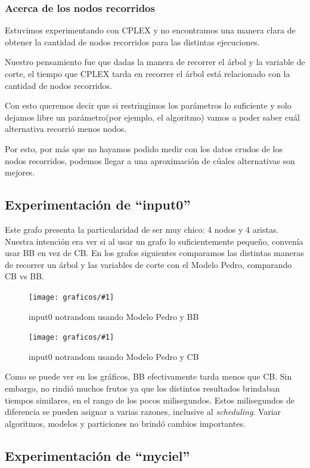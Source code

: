 \documentclass[a4paper, 10pt, twoside]{article}
\newcommand{\diagramavfig}[2]{%
  \begin{figure}[H]
    \texttt{[image: graficos/\#1]}%
    \caption{#2}
    \label{fig:#1}
  \end{figure}
}
\begin{document}
\subsubsection{Acerca de los nodos recorridos}

Estuvimos experimentando con CPLEX y no encontramos una manera clara de obtener la cantidad de nodos recorridos para las distintas ejecuciones.

Nuestro pensamiento fue que dadas la manera de recorrer el árbol y la variable de corte, el tiempo que CPLEX tarda en recorrer el árbol está relacionado con la cantidad de nodos recorridos. 

Con esto queremos decir que si restringimos los parámetros lo suficiente y solo dejamos libre un parámetro(por ejemplo, el algoritmo) vamos a poder saber cuál alternativa recorrió menos nodos.

Por esto, por más que no hayamos podido medir con los datos crudos de los nodos recorridos, podemos llegar a una aproximación de cúales alternativas son mejores.

\subsection{Experimentación de ``input0''}

Este grafo presenta la particularidad de ser muy chico: 4 nodos y 4 aristas. Nuestra intención era ver si al usar un grafo lo suficientemente pequeño, convenía usar BB en vez de CB. En los grafos siguientes comparamos las distintas maneras de recorrer un árbol y las variables de corte con el Modelo Pedro, comparando CB vs BB.

\diagramavfig{input0_notrandom_1_bb_0_segunJuntada}{input0 notrandom usando Modelo Pedro y BB}
\diagramavfig{input0_notrandom_1_cb_0_segunJuntada}{input0 notrandom usando Modelo Pedro y CB}

Como se puede ver en los gráficos, BB efectivamente tarda menos que CB. Sin embargo, no rindió muchos frutos ya que los distintos resultados brindaban tiempos similares, en el rango de los pocos milisegundos. Estos milisegundos de diferencia se pueden asignar a varias razones, inclusive al \emph{scheduling}. Variar algoritmos, modelos y particiones no brindó cambios importantes.

\subsection{Experimentación de ``myciel''}
\end{document}

